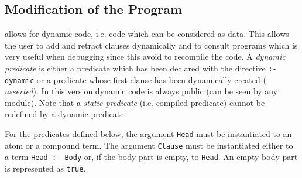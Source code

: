 \subsection{Modification of the Program}
\label{dynamic}


{\wamcc} allows for dynamic code, i.e. code which can be considered as
data. This allows the user to add and retract clauses dynamically and
to consult programs which is very useful when debugging since this
avoid to recompile the code. A {\em dynamic predicate} is either a
predicate which has been declared with the directive {\tt :- dynamic}
or a predicate whose first clause has been dynamically created ({\em
asserted}). In this version dynamic code is always public (can be seen
by any module). Note that a {\em static predicate} (i.e. compiled
predicate) cannot be redefined by a dynamic predicate.


For the predicates defined below, the argument {\tt Head} must be
instantiated to an atom or a compound term.  The argument {\tt Clause}
must be instantiated either to a term {\tt Head~:-~Body}
or, if the body part is empty, to {\tt Head}.  An empty body part is
represented as {\tt true}. 

